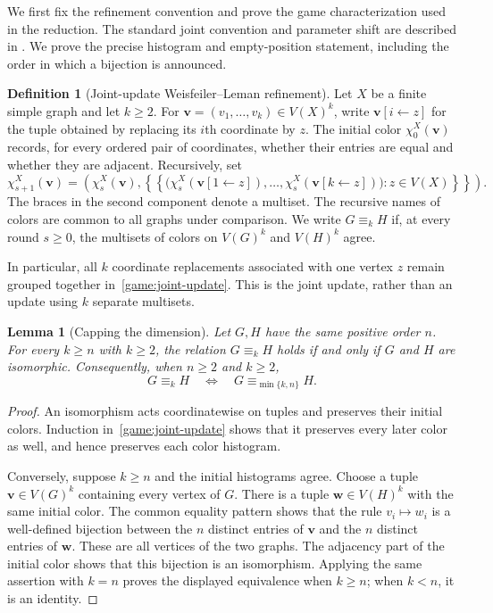 \documentclass[11pt]{article}
\newtheorem{lemma}[theorem]{Lemma}
\theoremstyle{definition}
\newtheorem{definition}[theorem]{Definition}
\begin{document}
We first fix the refinement convention and prove the game characterization
used in the reduction.  The standard joint convention and parameter shift are described in
\citep[Section~2.2 and Theorem~1]{KieferNeuen2019}. We prove the precise
histogram and empty-position statement, including the order in which
a bijection is announced.

\begin{definition}[Joint-update Weisfeiler--Leman refinement]
\label{def:joint-wl}
Let $X$ be a finite simple graph and let $k\geq 2$.  For
$\mathbf v=(v_1,\ldots,v_k)\in V(X)^k$, write
$\mathbf v[i\leftarrow z]$ for the tuple obtained by replacing its $i$th
coordinate by $z$.  The initial color $\chi_0^X(\mathbf v)$ records, for every
ordered pair of coordinates, whether their entries are equal and whether
they are adjacent.  Recursively, set
\begin{equation}
\label{game:joint-update}
 \chi_{s+1}^X(\mathbf v)=
 \left(\chi_s^X(\mathbf v),
 \left\{\!\!\left\{
 \bigl(\chi_s^X(\mathbf v[1\leftarrow z]),\ldots,
       \chi_s^X(\mathbf v[k\leftarrow z])\bigr):z\in V(X)
 \right\}\!\!\right\}\right).
\end{equation}
The braces in the second component denote a multiset.  The recursive names
of colors are common to all graphs under comparison.  We write
$G\equiv_k H$ if, at every round $s\geq 0$, the multisets of colors on
$V(G)^k$ and $V(H)^k$ agree.
\end{definition}

In particular, all $k$ coordinate replacements associated with one vertex
$z$ remain grouped together in~\eqref{game:joint-update}.  This is the joint
update, rather than an update using $k$ separate multisets.

\begin{lemma}[Capping the dimension]
\label{lem:dimension-cap}
Let $G,H$ have the same positive order $n$.  For every $k\geq n$ with
$k\geq 2$, the relation $G\equiv_k H$ holds if and only if $G$ and $H$ are
isomorphic.  Consequently, when $n\geq 2$ and $k\geq 2$,
\[
 G\equiv_k H \quad\Longleftrightarrow\quad
 G\equiv_{\min\{k,n\}}H.
\]
\end{lemma}

\begin{proof}
An isomorphism acts coordinatewise on tuples and preserves their initial
colors.  Induction in~\eqref{game:joint-update} shows that it preserves every
later color as well, and hence preserves each color histogram.

Conversely, suppose $k\geq n$ and the initial histograms agree.  Choose a
tuple $\mathbf v\in V(G)^k$ containing every vertex of $G$.  There is a tuple
$\mathbf w\in V(H)^k$ with the same initial color.  The common equality
pattern shows that the rule $v_i\mapsto w_i$ is a well-defined bijection
between the $n$ distinct entries of $\mathbf v$ and the $n$ distinct entries
of $\mathbf w$.  These are all vertices of the two graphs.  The adjacency
part of the initial color shows that this bijection is an isomorphism.
Applying the same assertion with $k=n$ proves the displayed equivalence
when $k\geq n$; when $k<n$, it is an identity.
\end{proof}
\end{document}
